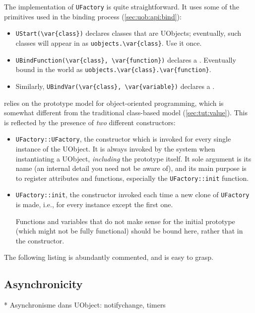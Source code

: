 The implementation of \lstinline|UFactory| is quite straightforward.
It uses some of the primitives used in the binding process
(\autoref{sec:uob:api:bind}):
\begin{itemize}
\item \lstinline|UStart(\var{class})| declares classes that are
  UObjects; eventually, such classes will appear in \us as
  \lstinline|uobjects.\var{class}|.  Use it once.

\item \lstinline|UBindFunction(\var{class}, \var{function})| declares
  a .  Eventually bound in the \us world as
  \lstinline|uobjects.\var{class}.\var{function}|.

\item Similarly, \lstinline|UBindVar(\var{class}, \var{variable})|
  declares a .
\end{itemize}

\urbi relies on the prototype model for object-oriented programming,
which is somewhat different from the traditional \Cxx class-based
model (\autoref{sec:tut:value}).  This is reflected by the presence of 
\emph{two} different constructors:
\begin{itemize}
\item \lstinline|UFactory::UFactory|, the \Cxx constructor which is
  invoked for every single instance of the UObject.  It is always
  invoked by the \urbi system when instantiating a UObject,
  \emph{including} the prototype itself.  It sole argument is its name
  (an internal detail you need not be aware of), and its main purpose
  is to register attributes and functions, especially the
  \lstinline|UFactory::init| function.

\item \lstinline|UFactory::init|, the \urbi constructor invoked each
  time a new clone of \lstinline|UFactory| is made, i.e., for every
  instance except the first one.
  
  Functions and variables that do not make sense for the initial
  prototype (which might not be fully functional) should be bound
  here, rather that in the \Cxx constructor.
\end{itemize}

The following listing is abundantly commented, and is easy to grasp.



\subsection{Asynchronicity}
\begin{todo}
  * Asynchronisme dans UObject: notifychange, timers
\end{todo}

